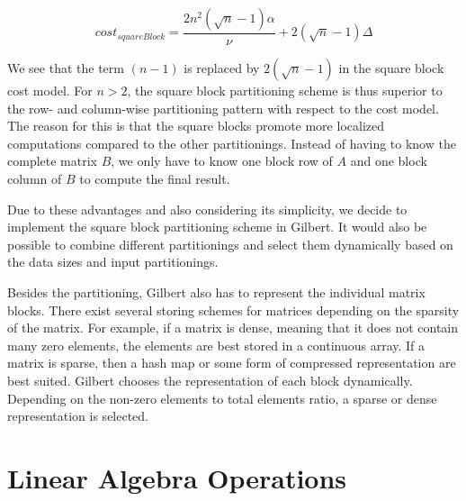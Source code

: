 \begin{displaymath}
	cost_{squareBlock} = \frac{2n^2\left(\sqrt{n}-1\right)\alpha}{\nu} + 2\left(\sqrt{n}-1\right)\Delta
\end{displaymath}

We see that the term $(n-1)$ is replaced by $2\left(\sqrt{n}-1\right)$ in the square block cost model.
For $n>2$, the square block partitioning scheme is thus superior to the row- and column-wise partitioning pattern with respect to the cost model.
The reason for this is that the square blocks promote more localized computations compared to the other partitionings.
Instead of having to know the complete matrix $B$, we only have to know one block row of $A$ and one block column of $B$ to compute the final result.

Due to these advantages and also considering its simplicity, we decide to implement the square block partitioning scheme in Gilbert.
It would also be possible to combine different partitionings and select them dynamically based on the data sizes and input partitionings.

Besides the partitioning, Gilbert also has to represent the individual matrix blocks.
There exist several storing schemes for matrices depending on the sparsity of the matrix.
For example, if a matrix is dense, meaning that it does not contain many zero elements, the elements are best stored in a continuous array.
If a matrix is sparse, then a hash map or some form of compressed representation are best suited.
Gilbert chooses the representation of each block dynamically.
Depending on the non-zero elements to total elements ratio, a sparse or dense representation is selected.

\section{Linear Algebra Operations}
\label{sec:LinearAlgebraOperations}

